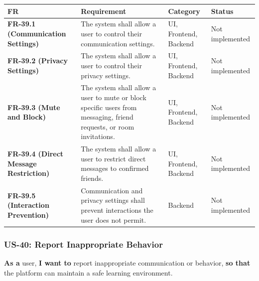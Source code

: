 \documentclass[12pt]{article}
\renewcommand{\baselinestretch}{1.5}
\begin{document}
\begingroup
\small
\renewcommand{\baselinestretch}{1.0}\selectfont
\renewcommand{\arraystretch}{1.15}
\setlength{\tabcolsep}{6pt}
\begin{longtable}{|>{\raggedright\arraybackslash}p{}|>{\raggedright\arraybackslash}p{}|>{\raggedright\arraybackslash}p{}|>{\raggedright\arraybackslash}p{}|}
\hline
\textbf{FR} & \textbf{Requirement} & \textbf{Category} & \textbf{Status} \\ \hline
\endhead
\textbf{FR-39.1 (Communication Settings)} & The system shall allow a user to control their communication settings. & UI, Frontend, Backend & Not implemented \\ \hline
\textbf{FR-39.2 (Privacy Settings)} & The system shall allow a user to control their privacy settings. & UI, Frontend, Backend & Not implemented \\ \hline
\textbf{FR-39.3 (Mute and Block)} & The system shall allow a user to mute or block specific users from messaging, friend requests, or room invitations. & UI, Frontend, Backend & Not implemented \\ \hline
\textbf{FR-39.4 (Direct Message Restriction)} & The system shall allow a user to restrict direct messages to confirmed friends. & UI, Frontend, Backend & Not implemented \\ \hline
\textbf{FR-39.5 (Interaction Prevention)} & Communication and privacy settings shall prevent interactions the user does not permit. & Backend & Not implemented \\ \hline
\end{longtable}
\endgroup
\par\medskip

\hypertarget{sec:us-40-report-inappropriate-behavior}{}
\subsubsection*{US-40: Report Inappropriate Behavior}
\par\medskip

\textbf{As a} user, \textbf{I want to} report inappropriate communication or behavior, \textbf{so that} the platform can maintain a safe learning environment.
\par\medskip
\end{document}
